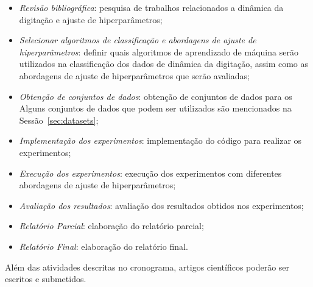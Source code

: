\begin{itemize}
    \item \textit{Revisão bibliográfica}: pesquisa de trabalhos relacionados a dinâmica da digitação e ajuste de hiperparâmetros;
    \item \textit{Selecionar algoritmos de classificação e abordagens de ajuste de hiperparâmetros}: definir quais algoritmos de aprendizado de máquina serão utilizados na classificação dos dados de dinâmica da digitação, assim como as abordagens de ajuste de hiperparâmetros que serão avaliadas;
    \item \textit{Obtenção de conjuntos de dados}: obtenção de conjuntos de dados para os  Alguns conjuntos de dados que podem ser utilizados são mencionados na Sessão~\ref{sec:datasets};
    \item \textit{Implementação dos experimentos}: implementação do código para realizar os experimentos;
    \item \textit{Execução dos experimentos}: execução dos experimentos com diferentes abordagens de ajuste de hiperparâmetros;
    \item \textit{Avaliação dos resultados}: avaliação dos resultados obtidos nos experimentos;
    \item \textit{Relatório Parcial}: elaboração do relatório parcial;
    \item \textit{Relatório Final}: elaboração do relatório final.
\end{itemize}

Além das atividades descritas no cronograma, artigos científicos poderão ser escritos e submetidos.